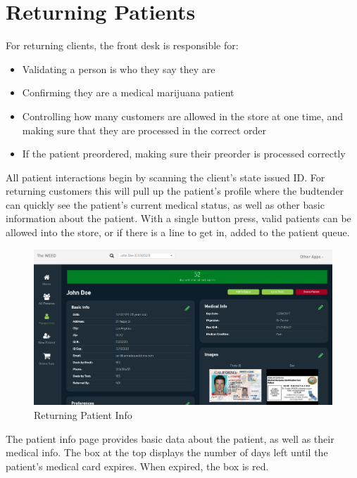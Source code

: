 \documentclass[]{book}
\theoremstyle{definition}
\theoremstyle{definition}
\theoremstyle{definition}
\theoremstyle{remark}
\begin{document}
\hypertarget{returning-patients}{\section{Returning
Patients}\label{returning-patients}}

For returning clients, the front desk is responsible for:

\begin{itemize}
\item
  Validating a person is who they say they are
\item
  Confirming they are a medical marijuana patient
\item
  Controlling how many customers are allowed in the store at one time,
  and making sure that they are processed in the correct order
\item
  If the patient preordered, making sure their preorder is processed
  correctly
\end{itemize}

All patient interactions begin by scanning the client's state issued ID.
For returning customers this will pull up the patient's profile where
the budtender can quickly see the patient's current medical status, as
well as other basic information about the patient. With a single button
press, valid patients can be allowed into the store, or if there is a
line to get in, added to the patient queue.

\begin{figure}
\centering
\includegraphics{images/patientInfo.png}
\caption{Returning Patient Info}
\end{figure}

The patient info page provides basic data about the patient, as well as
their medical info. The box at the top displays the number of days left
until the patient's medical card expires. When expired, the box is red.
\end{document}
